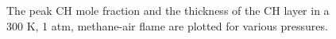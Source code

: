 \begin{figure}

\centering



\caption[Methane-air flame results - II]{The peak CH mole fraction and the thickness of the CH layer in a 300 K, 1 atm, methane-air flame are plotted for various pressures.}

\label{fig:01-060}

\end{figure}
